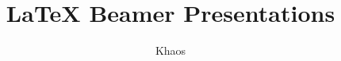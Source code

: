 \documentclass[14pt]{beamer}
\begin{document}
	\author{Khaos}
	\title{\LaTeX{} Beamer Presentations}
	\begin{frame}[plain]
		\maketitle
	\end{frame}
	
	\begin{frame}
		\frametitle{}
	\end{frame}
\end{document}
